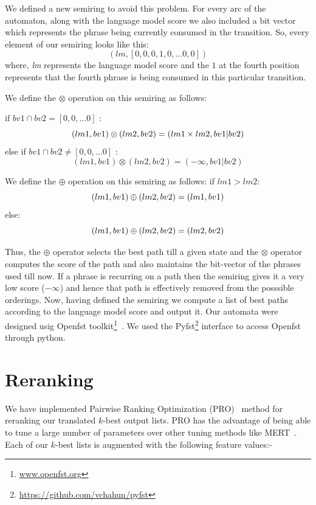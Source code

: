 \documentclass[11pt]{article}
\numberwithin{equation}{section}
\begin{document}
We defined a new semiring to avoid this problem. For every arc of the automaton, along with the language model score we also included
a bit vector which represents the phrase being currently consumed in the transition. So, every element of our semiring looks like this:
\[
(lm, [0,0,0,1,0, \dots 0, 0])
\]
where, \textit{lm} represents the language model score and the $1$ at the fourth position represents that the fourth phrase is being consumed in this particular transition.

We define the $\otimes$ operation on this semiring as follows:

if $bv1 \cap bv2 = [0,0, \dots 0]$ :
\[
(lm1, bv1) \otimes (lm2, bv2) = (lm1 \times lm2, bv1 \vert bv2) \\
\]
else if $bv1 \cap bv2 \neq [0,0, \dots 0]$ :
\[
(lm1, bv1) \otimes (lm2, bv2) = (-\infty, bv1 \vert bv2) 
\]

We define the $\oplus$ operation on this semiring as follows:
if $lm1 > lm2$:
\[
(lm1, bv1) \oplus (lm2, bv2) = (lm1, bv1) \\
\]
else:
\[
(lm1, bv1) \oplus (lm2, bv2) = (lm2, bv2) \\
\]

Thus, the $\oplus$ operator selects the best path till a given state and the $\otimes$ operator computes
the score of the path and also maintains the bit-vector of the phrases used till now. If a phrase
is recurring on a path then the semiring gives it a very low score ($-\infty$) and hence that path is effectively
removed from the posssible orderings. Now, having defined the semiring we compute a list of best paths according to the language model 
score and output it.
Our automata were designed usig Openfst toolkit\footnote{\url{www.openfst.org}}~\cite{openfst}. We used the 
Pyfst\footnote{\url{https://github.com/vchahun/pyfst}} interface to access Openfst through python.

\section{Reranking}
\label{sec:reranking}

We have implemented Pairwise Ranking Optimization (PRO)~\cite{hopkins-may:2011:EMNLP} method for reranking our translated $k$-best 
output lists. PRO has the advantage of being able to tune a large number of parameters over other tuning methods like MERT~\cite{Och:2003:MER:1075096.1075117}. Each of our $k$-best lists is augmented with the following feature values:-
\end{document}
